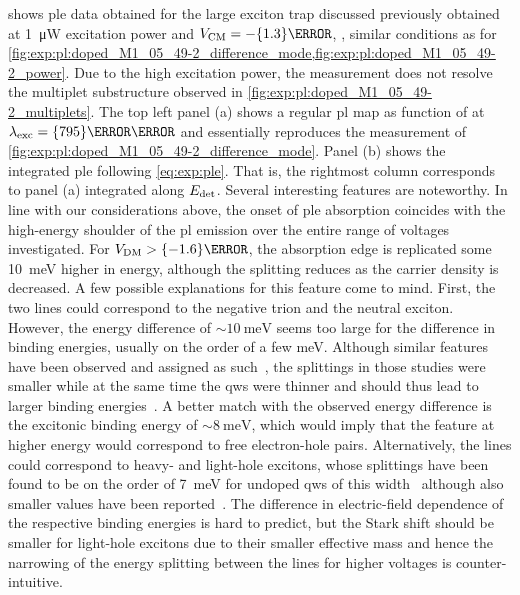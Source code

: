  shows \gls{ple} data obtained for the large exciton trap discussed previously obtained at \qty{1}{\micro\watt} excitation power and $\VCM = -\qty{1.3}{\volt}$, \ie, similar conditions as for \cref{fig:exp:pl:doped_M1_05_49-2_difference_mode,fig:exp:pl:doped_M1_05_49-2_power}.
Due to the high excitation power, the measurement does not resolve the multiplet substructure observed in \cref{fig:exp:pl:doped_M1_05_49-2_multiplets}.
The top left panel (a) shows a regular \gls{pl} map as function of \VDM at $\lambda_{\mr{exc}} = \qty{795}{\nano\meter}$ and essentially reproduces the measurement of \cref{fig:exp:pl:doped_M1_05_49-2_difference_mode}.
Panel (b) shows the integrated \gls{ple} following \cref{eq:exp:ple}.
That is, the rightmost column corresponds to panel (a) integrated along $E_{\mathrm{det}}$.
Several interesting features are noteworthy.
In line with our considerations above, the onset of \gls{ple} absorption coincides with the high-energy shoulder of the \gls{pl} emission over the entire range of voltages investigated.
For $\VDM > \qty{-1.6}{\volt}$, the absorption edge is replicated some \qty{10}{\milli\electronvolt} higher in energy, although the splitting reduces as the carrier density is decreased.
A few possible explanations for this feature come to mind.
First, the two lines could correspond to the negative trion and the neutral exciton.
However, the energy difference of $\sim\qty{10}{\milli\electronvolt}$ seems too large for the difference in binding energies, usually on the order of a few \unit{\milli\electronvolt}.
Although similar features have been observed and assigned as such~\cite{Brown1996,Huard2000,Yusa2000}, the splittings in those studies were smaller while at the same time the \glspl{qw} were thinner and should thus lead to larger binding energies~\cite{Esser2000,Esser2001}.
A better match with the observed energy difference is the excitonic binding energy of $\sim\qty{8}{\milli\electronvolt}$, which would imply that the feature at higher energy would correspond to free electron-hole pairs.
Alternatively, the lines could correspond to heavy- and light-hole excitons, whose splittings have been found to be on the order of \qty{7}{\milli\electronvolt} for undoped \glspl{qw} of this width~\cite{ElKhalifi1989} although also smaller values have been reported~\cite{Bataev2022}.
The difference in electric-field dependence of the respective binding energies is hard to predict, but the Stark shift should be smaller for light-hole excitons due to their smaller effective mass and hence the narrowing of the energy splitting between the lines for higher voltages is counter-intuitive.
